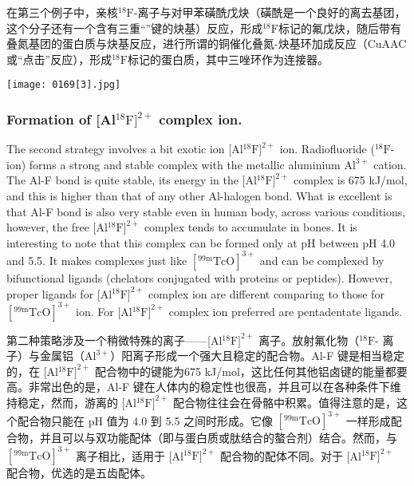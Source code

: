 \documentclass[dvipsnames, svgnames,a4paper,11pt]{article}
\begin{document}
在第三个例子中，亲核${}^\mathrm{18}\mathrm{F}$-离子与对甲苯磺酰戊炔（磺酰是一个良好的离去基团，这个分子还有一个含有三重“”键的炔基）反应，形成${}^\mathrm{18}\mathrm{F}$标记的氟戊炔，随后带有叠氮基团的蛋白质与炔基反应，进行所谓的铜催化叠氮-炔基环加成反应（CuAAC或“点击”反应），形成${}^\mathrm{18}\mathrm{F}$标记的蛋白质，其中三唑环作为连接器。

\begin{figure*}[h]
	\centering
    \texttt{[image: 0169[3].jpg]}    
\end{figure*}

\subsubsection{Formation of [Al${}^\mathrm{18}\mathrm{F}]^{2+}$ complex ion. }
The second strategy involves a bit exotic ion [Al${}^\mathrm{18}\mathrm{F}]^{2+}$ ion. Radiofluoride (${}^\mathrm{18}\mathrm{F}$- ion)
forms a strong and stable complex with the metallic aluminium $\mathrm{Al}^{3+}$ cation. The Al-F
bond is quite stable, its energy in the [Al${}^\mathrm{18}\mathrm{F}]^{2+}$ complex is 675 kJ/mol, and this is higher than that of any other Al-halogen bond. What is excellent is that Al-F bond is
also very stable even in human body, across various conditions, however, the free
[Al${}^\mathrm{18}\mathrm{F}]^{2+}$ complex tends to accumulate in bones. It is interesting to note that this
complex can be formed only at pH between pH 4.0 and 5.5. It makes complexes just
like $[{}^\mathrm{99m}\mathrm{TcO}]^{3+}$ and can be complexed by bifunctional ligands (chelators conjugated
with proteins or peptides). However, proper ligands for [Al${}^\mathrm{18}\mathrm{F}]^{2+}$ complex ion are
different comparing to those for $[{}^\mathrm{99m}\mathrm{TcO}]^{3+}$ ion. For [Al${}^\mathrm{18}\mathrm{F}]^{2+}$ complex ion preferred
are pentadentate ligands.

第二种策略涉及一个稍微特殊的离子——[Al${}^\mathrm{18}\mathrm{F}]^{2+}$ 离子。放射氟化物（${}^\mathrm{18}\mathrm{F}$- 离子）与金属铝（$\mathrm{Al}^{3+}$）阳离子形成一个强大且稳定的配合物。Al-F 键是相当稳定的，在 [Al${}^\mathrm{18}\mathrm{F}]^{2+}$ 配合物中的键能为675 kJ/mol，这比任何其他铝卤键的能量都要高。非常出色的是，Al-F 键在人体内的稳定性也很高，并且可以在各种条件下维持稳定，然而，游离的 [Al${}^\mathrm{18}\mathrm{F}]^{2+}$ 配合物往往会在骨骼中积累。值得注意的是，这个配合物只能在 pH 值为 4.0 到 5.5 之间时形成。它像 $[{}^\mathrm{99m}\mathrm{TcO}]^{3+}$ 一样形成配合物，并且可以与双功能配体（即与蛋白质或肽结合的螯合剂）结合。然而，与 $[{}^\mathrm{99m}\mathrm{TcO}]^{3+}$ 离子相比，适用于 [Al${}^\mathrm{18}\mathrm{F}]^{2+}$ 配合物的配体不同。对于 [Al${}^\mathrm{18}\mathrm{F}]^{2+}$ 配合物，优选的是五齿配体。
\end{document}
